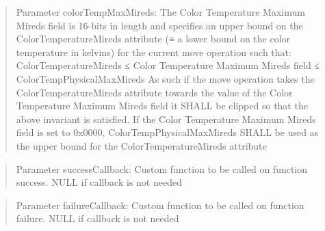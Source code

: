 \begin{quote}Parameter colorTempMaxMireds: The Color Temperature Maximum Mireds field is 16-bits in length and specifies an upper bound on the ColorTemperatureMireds attribute (≡ a lower bound on the color temperature in kelvins) for the current move operation such that: ColorTemperatureMireds ≤ Color Temperature Maximum Mireds field ≤ ColorTempPhysicalMaxMireds As such if the move operation takes the ColorTemperatureMireds attribute towards the value of the Color Temperature Maximum Mireds field it SHALL be clipped so that the above invariant is satisfied. If the Color Temperature Maximum Mireds field is set to 0x0000, ColorTempPhysicalMaxMireds SHALL be used as the upper bound for the ColorTemperatureMireds attribute\end{quote}
\begin{quote}Parameter successCallback: Custom function to be called on function success. NULL if callback is not needed\end{quote}
\begin{quote}Parameter failureCallback: Custom function to be called on function failure. NULL if callback is not needed\end{quote}


